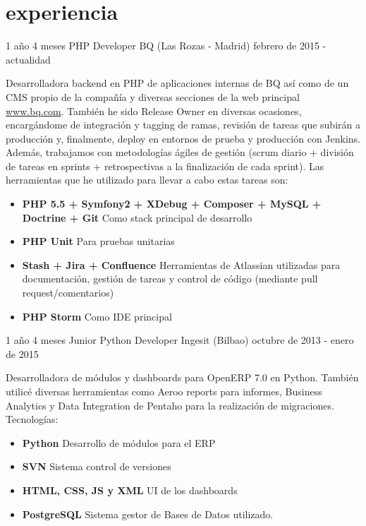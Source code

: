 \documentclass[]{friggeri-cv} %
\begin{document}

\section{experiencia}
\begin{entrylist}
\entry
{1 año 4 meses}
{PHP Developer {\normalfont BQ (Las Rozas - Madrid)}}
{febrero de 2015 - actualidad}
{Desarrolladora backend en PHP de aplicaciones internas de BQ as\'i como de un CMS propio de la compa\~n\'ia y diversas secciones de la web principal \href{http://bq.com}{www.bq.com}. Tambi\'en he sido Release Owner en diversas ocasiones, encarg\'andome de integraci\'on y tagging de ramas, revisi\'on de tareas que subir\'an a producci\'on y, finalmente, deploy en entornos de prueba y producci\'on con Jenkins. 
Adem\'as, trabajamos con metodolog\'ias \'agiles de gesti\'on (scrum diario + divisi\'on de tareas en sprints + retrospectivas a la finalizaci\'on de cada sprint).
 Las herramientas que he utilizado para llevar a cabo estas tareas son:
\begin{itemize}
\item\textbf{PHP 5.5 + Symfony2 + XDebug + Composer + MySQL + Doctrine + Git} Como stack principal de desarrollo
\item\textbf{PHP Unit} Para pruebas unitarias
\item\textbf{Stash + Jira + Confluence} Herramientas de Atlassian utilizadas para documentación, gesti\'on de tareas y control de c\'odigo (mediante pull request/comentarios)
\item\textbf{PHP Storm} Como IDE principal\\
\end{itemize}}
\end{entrylist}

\begin{entrylist}
\entry
{1 año 4 meses}
{Junior Python Developer {\normalfont Ingesit (Bilbao)}}
{octubre de 2013 - enero de 2015}
{Desarrolladora de m\'odulos y dashboards para OpenERP 7.0 en Python. Tambi\'en utilic\'e diversas herramientas como Aeroo reports para informes, Business Analytics y Data Integration de Pentaho para la realizaci\'on de migraciones. Tecnolog\'ias:
\begin{itemize}
\item\textbf{Python} Desarrollo de módulos para el ERP
\item\textbf{SVN} Sistema control de versiones
\item\textbf{HTML, CSS, JS y XML} UI de los dashboards
\item\textbf{PostgreSQL} Sistema gestor de Bases de Datos utilizado.\\
\end{itemize}}
\end{entrylist}
\end{document}
